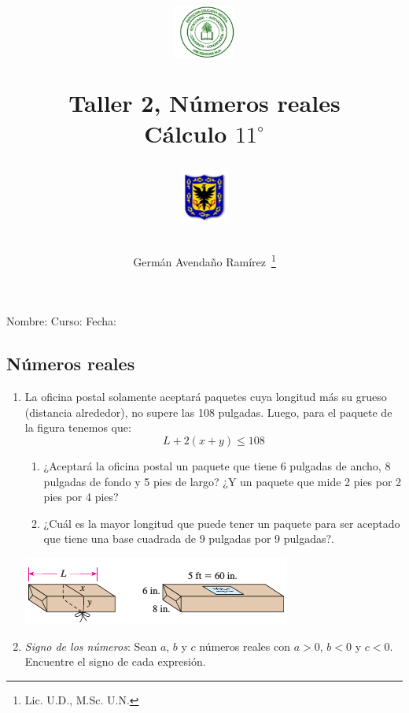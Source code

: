\documentclass[10pt,letter,twoside]{article}
\author{Germ\'an Avenda\~no Ram\'irez~\thanks{Lic. U.D., M.Sc. U.N.}}
\title{\begin{minipage}{.2\textwidth}
\includegraphics[height=1.75cm]{Images/logo-colegio.png}\end{minipage}
\begin{minipage}{.55\textwidth}
\begin{center}
Taller 2, Números reales\\
Cálculo $11^{\circ}$
\end{center}
\end{minipage}\hfill
\begin{minipage}{.2\textwidth}
\includegraphics[height=1.75cm]{Images/logo-sed.png} 
\end{minipage}}
\date{}
\begin{document}
\maketitle
Nombre: \hrulefill Curso: \underline{\hspace*{44pt}} Fecha: \underline{\hspace*{2.5cm}}\\
\begin{multicols}{2}
\section*{Números reales}
\begin{enumerate}
  \item La oficina postal solamente aceptará paquetes cuya longitud más su grueso (distancia alrededor), no supere las 108 pulgadas.	Luego, para el paquete de la figura tenemos que:
  \[L+2(x+y)\leq108 \]
  \begin{enumerate}
   \item ¿Aceptará la oficina postal un paquete que tiene 6 pulgadas de ancho, 8 pulgadas de fondo y 5 pies de largo? ¿Y un paquete que mide 2  pies por 2 pies por 4 pies?
   \item ¿Cuál es la mayor longitud que puede tener un paquete para ser aceptado que tiene una base cuadrada de 9 pulgadas por 9 pulgadas?.
  \end{enumerate}
  \begin{center}
 \includegraphics[scale=.9]{./Images/paquetepostal.png}
\end{center}
\item \emph{Signo de los números}: Sean $a$, $b$ y $c$ números reales con $a>0$, $b<0$ y $c<0$. Encuentre el signo de cada expresión.
\begin{enumerate}
\end{enumerate}
\end{enumerate}
\end{multicols}
\end{document}
